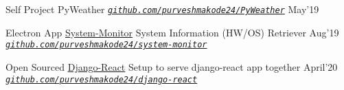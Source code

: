 \begin{cventries}
  \vspace{0.5mm} %
    
  \cventry
  {Self Project}
  {PyWeather}
   {\emph{\texttt{\href{https://github.com/purveshmakode24/PyWeather}{github.com/purveshmakode24/PyWeather}}}}
  {May'19}
  {
    \begin{cvitems}
        \vspace{1mm}
    \end{cvitems}
  }
  
  \vspace{0.5mm} %
 

  \smallcventry
  {Electron App}
  {\href{https://github.com/purveshmakode24/django-react}{System-Monitor}}
  {System Information (HW/OS) Retriever}
  {Aug'19}
  {\emph{\texttt{\href{https://github.com/purveshmakode24/system-monitor}{github.com/purveshmakode24/system-monitor}}}}
  
  \vspace{0.5mm} 
   
   \smallcventry
  {Open Sourced}
  {\href{https://github.com/purveshmakode24/django-react}{Django-React}}
  {Setup to serve django-react app together}
  {April'20}
  {\emph{\texttt{\href{https://github.com/purveshmakode24/django-react}{github.com/purveshmakode24/django-react}}}}
  

\end{cventries}
